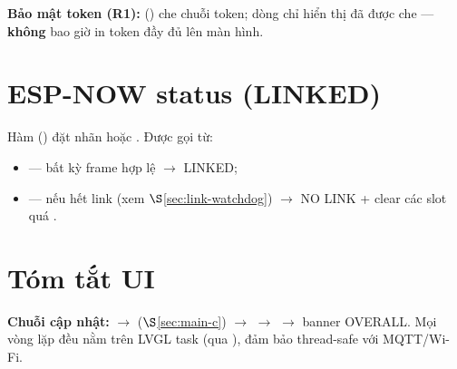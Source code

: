 \noindent\textbf{Bảo mật token (R1):}  ()
che chuỗi token; dòng  chỉ hiển thị
 đã được che — \textbf{không} bao giờ in token
đầy đủ lên màn hình.

\section{ESP-NOW status (LINKED)}
\label{sec:linked}

Hàm  ()
đặt nhãn  hoặc .  Được gọi từ:
\begin{itemize}
\item {} — bất kỳ frame hợp lệ $\rightarrow$ LINKED;
\item {} — nếu hết link (xem $\S$\ref{sec:link-watchdog})
  $\rightarrow$ NO LINK + clear các slot quá .
\end{itemize}

\section{Tóm tắt UI}
\label{sec:ui-summary}

\textbf{Chuỗi cập nhật:} 
$\rightarrow$ 
($\S$\ref{sec:main-c}) $\rightarrow$ 
$\rightarrow$  $\rightarrow$ banner OVERALL.
Mọi vòng lặp đều nằm trên LVGL task (qua ),
đảm bảo thread-safe với MQTT/Wi-Fi.
